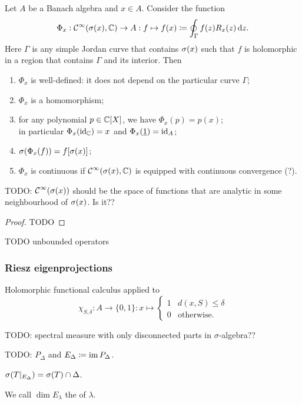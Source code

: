 \begin{theorem} 
\label{holomorphicFunctionalCalculus} \label{holomorphicSpectralMapping}
Let $A$ be a Banach algebra and $x\in A$. Consider the function
\[ \Phi_x: \operatorname{\mathcal{C}}^\infty(\sigma(x),\mathbb{C}) \to A: f\mapsto f(x)\coloneqq \oint_\Gamma f(z)R_x(z)\operatorname{d \!}{z}. \]
Here $\Gamma$ is any simple Jordan curve that contains $\sigma(x)$ such that $f$ is holomorphic in a region that contains $\Gamma$ and its interior. Then
\begin{enumerate}
\item $\Phi_x$ is well-defined: it does not depend on the particular curve $\Gamma$;
\item $\Phi_x$ is a homomorphism;
\item for any polynomial $p\in \mathbb{C}[X]$, we have $\Phi_x(p) = p(x)$; \\
in particular $\Phi_x(\operatorname{id}_{\mathbb{C}}) = x$ and $\Phi_x(\underline{1}) = \operatorname{id}_A$;
\item $\sigma(\Phi_x(f)) = f[\sigma(x)]$;
\item $\Phi_x$ is continuous if $\operatorname{\mathcal{C}}^\infty(\sigma(x),\mathbb{C})$ is equipped with continuous convergence (?).
\end{enumerate}
\end{theorem}
TODO: $\operatorname{\mathcal{C}}^\infty(\sigma(x))$ should be the space of functions that are analytic in some neighbourhood of $\sigma(x)$. Is it??
\begin{proof}
TODO
\end{proof}

TODO unbounded operators

\subsubsection{Riesz eigenprojections}
Holomorphic functional calculus applied to
\[ \chi_{S,\delta}: A\to \{0,1\}: x\mapsto \begin{cases}
1 & d(x,S) \leq \delta \\
0 & \text{otherwise}.
\end{cases} \]

TODO: spectral measure with only disconnected parts in $\sigma$-algebra??

TODO: $P_\Delta$ and $E_\Delta \coloneqq \operatorname{im} P_\Delta$.

\begin{lemma}
$\sigma(T|_{E_\Delta}) = \sigma(T)\cap\Delta$.
\end{lemma}

\begin{definition}
We call $\dim E_\lambda$ the  of $\lambda$.
\end{definition}

